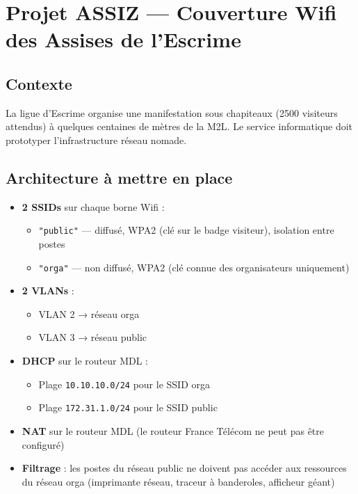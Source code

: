 \documentclass[a4paper,12pt]{article}
\begin{document}
\section{Projet ASSIZ — Couverture Wifi des Assises de l'Escrime}

\subsection{Contexte}
La ligue d'Escrime organise une manifestation sous chapiteaux (2500 visiteurs attendus) à quelques centaines
de mètres de la M2L. Le service informatique doit prototyper l'infrastructure réseau nomade.

\subsection{Architecture à mettre en place}

\begin{itemize}[noitemsep]
    \item \textbf{2 SSIDs} sur chaque borne Wifi :
    \begin{itemize}[noitemsep]
        \item \texttt{"public"} — diffusé, WPA2 (clé sur le badge visiteur), isolation entre postes
        \item \texttt{"orga"} — non diffusé, WPA2 (clé connue des organisateurs uniquement)
    \end{itemize}
    \item \textbf{2 VLANs} :
    \begin{itemize}[noitemsep]
        \item VLAN 2 → réseau orga
        \item VLAN 3 → réseau public
    \end{itemize}
    \item \textbf{DHCP} sur le routeur MDL :
    \begin{itemize}[noitemsep]
        \item Plage \texttt{10.10.10.0/24} pour le SSID orga
        \item Plage \texttt{172.31.1.0/24} pour le SSID public
    \end{itemize}
    \item \textbf{NAT} sur le routeur MDL (le routeur France Télécom ne peut pas être configuré)
    \item \textbf{Filtrage} : les postes du réseau public ne doivent pas accéder aux ressources du réseau orga
          (imprimante réseau, traceur à banderoles, afficheur géant)
\end{itemize}
\end{document}
